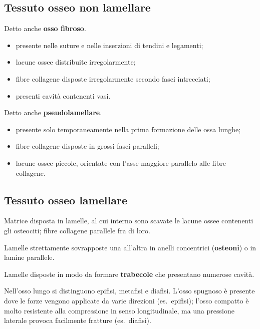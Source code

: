 \subsection{Tessuto osseo non lamellare}

Detto anche \textbf{osso fibroso}.
\begin{itemize}
  \item presente nelle suture e nelle inserzioni di tendini e legamenti;
  \item lacune ossee distribuite irregolarmente;
  \item fibre collagene disposte irregolarmente secondo fasci intrecciati;
  \item presenti cavità contenenti vasi.
\end{itemize}

Detto anche \textbf{pseudolamellare}.
\begin{itemize}
  \item presente solo temporaneamente nella prima formazione delle ossa lunghe;
  \item fibre collagene disposte in grossi fasci paralleli;
  \item lacune ossee piccole, orientate con l'asse maggiore parallelo alle fibre collagene.
\end{itemize}

\subsection{Tessuto osseo lamellare}

Matrice disposta in lamelle, al cui interno sono scavate le lacune ossee contenenti gli osteociti; fibre collagene parallele fra di loro.

Lamelle strettamente sovrapposte una all'altra in anelli concentrici (\textbf{osteoni}) o in lamine parallele.

Lamelle disposte in modo da formare \textbf{trabecole} che presentano numerose cavità.

Nell'osso lungo si distinguono epifisi, metafisi e diafisi. L'osso spugnoso è presente dove le forze vengono applicate da varie direzioni (es.\ epifisi); l'osso compatto è molto resistente alla compressione in senso longitudinale, ma una pressione laterale provoca facilmente fratture (es.\ diafisi).

